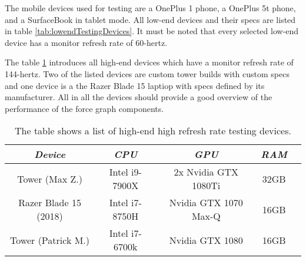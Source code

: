 The mobile devices used for testing are a OnePlus 1 phone, a OnePlus 5t phone, and a SurfaceBook in tablet mode. All low-end devices and their specs are listed in table \ref{tab:lowendTestingDevices}. It must be noted that every selected low-end device has a monitor refresh rate of 60-hertz. 

The table \ref{tab:highendTestingDevices} introduces all high-end devices which have a monitor refresh rate of 144-hertz. Two of the listed devices are custom tower builds with custom specs and one device is a the Razer Blade 15 laptiop with specs defined by its manufacturer. All in all the devices should provide a good overview of the performance of the force graph components.

\begin{table}
  \centering
  \begin{threeparttable}
    \caption{The table shows a list of high-end high refresh rate testing devices.}
    \label{tab:highendTestingDevices}
    \centering
    \def\rr{\rightskip=0pt plus1em \spaceskip=.3333em \xspaceskip=.5em\relax}
    \setlength{\tabcolsep}{1ex}
    \def\arraystretch{1.20}
    \setlength{\tabcolsep}{1ex}
    \small
    \begin{english}
      \begin{tabular}{|c||c|c|c|c|}
        \hline
          \multicolumn{1}{|c||}{\emph{Device}}&
          \multicolumn{1}{|c}{\emph{CPU}} &
          \multicolumn{1}{|c}{\emph{GPU}} &
          \multicolumn{1}{|c|}{\emph{RAM}} \\
        \hline
        \hline
        Tower (Max Z.) & 
        Intel i9-7900X & 
        2x Nvidia GTX 1080Ti & 
        32GB \\
        \hline
        Razer Blade 15 (2018) & 
        Intel i7-8750H & 
        Nvidia GTX 1070 Max-Q  & 
        16GB \\
        \hline
        Tower (Patrick M.) &
        Intel i7-6700k & 
        Nvidia GTX 1080 & 
        16GB \\
        \hline
      \end{tabular}  
    \end{english}
  \end{threeparttable}
\end{table}

